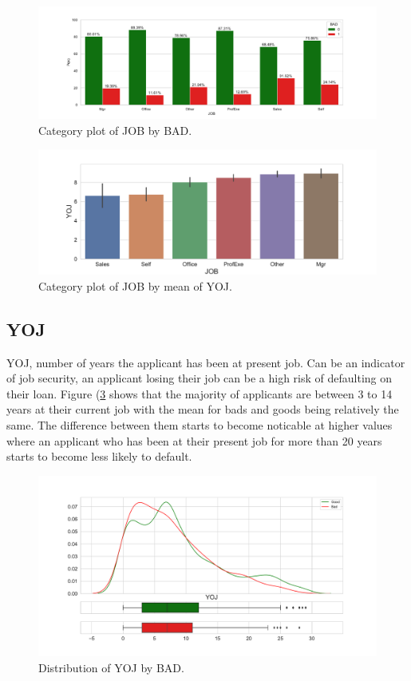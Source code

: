 \begin{figure}[H]
	\centering
	\includegraphics[scale=0.40]{figs/job_cat.pdf}
	\caption{Category plot of JOB by BAD. \label{job_cat}}
\end{figure}

\begin{figure}[H]
	\centering
	\includegraphics[scale=0.40]{figs/job_yoj_cat.pdf}
	\caption{Category plot of JOB by mean of YOJ. \label{job_yoj_cat}}
\end{figure}

\subsection*{YOJ}

YOJ, number of years the applicant has been at present job. Can be an indicator of job security, an applicant losing their job can be a high risk of defaulting on their loan. Figure (\ref{yoj_dist} shows that the majority of applicants are between 3 to 14 years at their current job with the mean for bads and goods being relatively the same. The difference between them starts to become noticable at higher values where an applicant who has been at their present job for more than 20 years starts to become less likely to default.

\begin{figure}[H]
	\centering
	\includegraphics[scale=0.40]{figs/yoj_dist.pdf}
	\caption{Distribution of YOJ by BAD. \label{yoj_dist}}
\end{figure}

